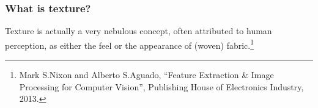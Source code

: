 \documentclass[notheorems,serif,table,compress]{beamer}  %
\begin{document}
%
%
%
%
%
%
%
%
%
%
%
%
%


\begin{frame}
\frametitle{What is texture?}
Texture is actually a very nebulous concept, often attributed to human perception, as either the feel or the appearance of (woven) fabric.\footnote{Mark S.Nixon and Alberto S.Aguado, ``Feature Extraction \& Image Processing for Computer Vision'', Publishing House of Electronics Industry, 2013.}
\end{frame}
\end{document}
